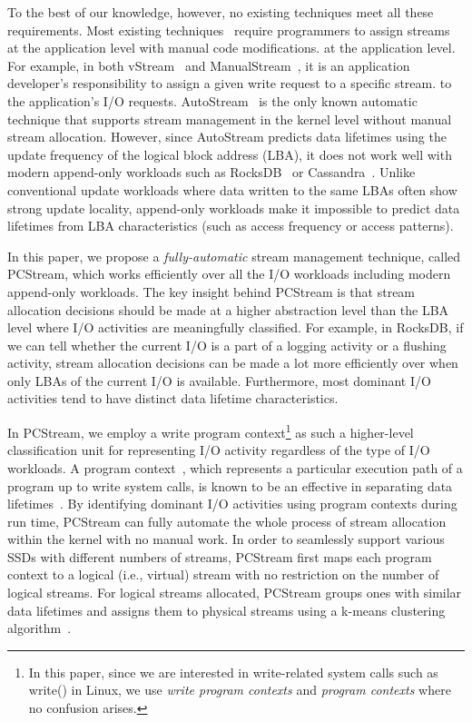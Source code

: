 To the best of our knowledge, however, no existing techniques meet all these requirements.  
Most existing techniques~\cite{MultiStream, Level, FStream, vStream} require 
programmers to assign streams at the application level with manual code modifications.
at the application level.  For example,  
in both \textsf{\small vStream}~\cite{vStream} and
\textsf{\small ManualStream}~\cite{MultiStream}, it is an application developer's 
responsibility to assign a given write request to a specific stream.
to the application's I/O requests.  
\textsf{\small AutoStream}~\cite{AutoStream} is the only known automatic technique 
that supports stream management in the kernel level without manual stream allocation.
However, since \textsf{\small AutoStream} predicts data lifetimes using the update frequency 
of the logical block address (LBA), it does not work well with modern append-only workloads 
such as RocksDB~\cite{RocksDB} or Cassandra~\cite{Cassandra}.  
Unlike conventional update workloads where data written to the same LBAs 
often show strong update locality, 
append-only workloads make it impossible to predict data lifetimes 
from LBA characteristics (such as access frequency or access patterns).  

In this paper, we propose a {\it fully-automatic} stream management technique, 
called PCStream, which works efficiently over all the I/O workloads including modern 
append-only workloads.   
The key insight behind PCStream is that stream allocation decisions should be made 
at a higher abstraction level than the LBA level where I/O activities are meaningfully classified.   
For example, in RocksDB, if we can tell whether the current I/O is a part of 
a logging activity or a flushing activity, stream allocation decisions can be made 
a lot more efficiently over when only LBAs of the current I/O is
available.   
Furthermore, most dominant I/O activities tend to have distinct data lifetime characteristics.  

In PCStream, we employ a write program context\footnote{In this paper, since we are 
interested in write-related system calls such as write() in Linux, 
we use {\it write program contexts} and {\it
program contexts} where no confusion arises.} as such a higher-level 
classification unit for representing I/O activity regardless of the type of I/O workloads. 
A program context~\cite{PC, PC2}, which represents a particular execution path of a program 
up to write system calls,
is known to be an effective in separating data lifetimes~\cite{PCHa}.  
By identifying dominant I/O activities using program contexts during run time, 
PCStream can fully automate the whole process of stream allocation within the 
kernel with no manual work.  In order to
seamlessly support various SSDs with different numbers of streams, PCStream first maps 
each program context to a logical (i.e., virtual) stream with no restriction 
on the number of logical streams.
For logical streams allocated, PCStream groups ones with similar data lifetimes 
and assigns them to physical streams using a k-means clustering algorithm~\cite{kmeans}. 

